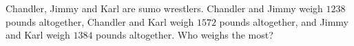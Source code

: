 Chandler, Jimmy and Karl are sumo wrestlers. Chandler and Jimmy weigh $1238$ pounds altogether, Chandler and Karl weigh $1572$ pounds altogether, and Jimmy and Karl weigh $1384$ pounds altogether. Who weighs the most?
